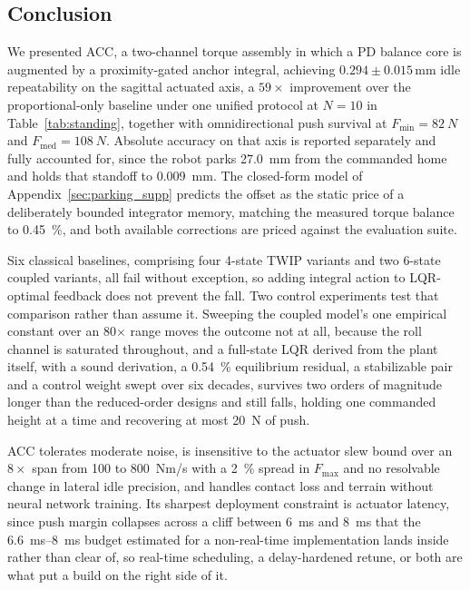 \documentclass[a4paper,fleqn]{cas-dc}
\begin{document}
\subsection{Conclusion}

We presented ACC, a two-channel torque assembly in which a PD balance core is
augmented by a proximity-gated anchor integral, achieving $0.294{\pm}0.015$\,mm
idle repeatability on the sagittal actuated axis, a $59{\times}$ improvement
over the proportional-only baseline under one unified protocol at $N{=}10$ in
Table~\ref{tab:standing}, together with omnidirectional push survival at
$F_{\min}{=}\SI{82}{N}$ and $F_{\text{med}}{=}\SI{108}{N}$. Absolute accuracy on
that axis is reported separately and fully accounted for, since the robot parks
\SI{27.0}{mm} from the commanded home and holds that standoff to \SI{0.009}{mm}.
The closed-form model of Appendix~\ref{sec:parking_supp} predicts the offset as
the static price of a deliberately bounded integrator memory, matching the
measured torque balance to \SI{0.45}{\percent}, and both available corrections
are priced against the evaluation suite.

Six classical baselines, comprising four 4-state TWIP variants and two 6-state
coupled variants, all fail without exception, so adding integral action to
LQR-optimal feedback does not prevent the fall. Two control experiments test
that comparison rather than assume it. Sweeping the coupled model's one
empirical constant over an \num{80}$\times$ range moves the outcome not at all,
because the roll channel is saturated throughout, and a full-state LQR derived
from the plant itself, with a sound derivation, a \SI{0.54}{\percent}
equilibrium residual, a stabilizable pair and a control weight swept over six
decades, survives two orders of magnitude longer than the reduced-order designs
and still falls, holding one commanded height at a time and recovering at most
\SI{20}{N} of push.

ACC tolerates moderate noise, is insensitive to the actuator slew bound over an
$8{\times}$ span from \SI{100}{} to \SI{800}{Nm/s} with a \SI{2}{\percent}
spread in $F_{\max}$ and no resolvable change in lateral idle precision, and
handles contact loss and terrain without neural network training. Its sharpest
deployment constraint is actuator latency, since push margin collapses across a
cliff between \SI{6}{ms} and \SI{8}{ms} that the \SIrange{6.6}{8}{ms} budget
estimated for a non-real-time implementation lands inside rather than clear of,
so real-time scheduling, a delay-hardened retune, or both are what put a build
on the right side of it.
\end{document}
